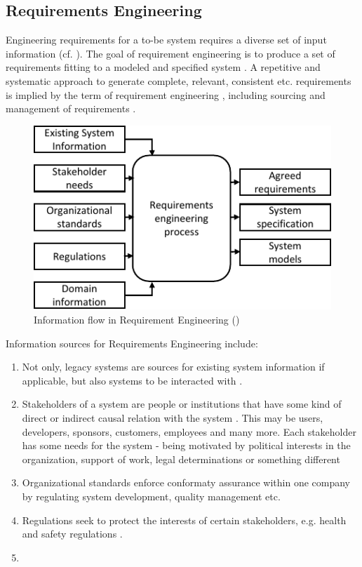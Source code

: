 \subsection{Requirements Engineering \label{ssec:reqEn}}
Engineering requirements for a to-be system requires a diverse set of input information (cf. ). The goal of requirement engineering is to produce a set of requirements fitting to a modeled and specified system \parencite[cf.][28]{Kotonya.2000}. A repetitive\label{iterative} and systematic approach to generate complete, relevant, consistent etc. requirements is implied by the term of requirement engineering \parencite[5]{Sommerville.2000}, including sourcing and management of requirements \parencite[262]{Pohl.2007}.
\begin{figure}[H]
    \centering
    \includegraphics[scale=1.3]{img/RequirementInformationStream.pdf}
    \caption[Information flow in Requirements Engineering]{Information flow in Requirement Engineering (\protect\cite[28]{Kotonya.2000})}
    \label{fig:reqFlow}
\end{figure}
Information sources for Requirements Engineering include:
\begin{enumerate}
    \item Not only, legacy systems are sources for existing system information if applicable, but also systems to be interacted with \parencite[cf.][28]{Kotonya.2000}.
    \item Stakeholders of a system are people or institutions that have some kind of direct or indirect causal relation with the system \parencite[cf.][8]{Sommerville.2000}. This may be users, developers, sponsors, customers, employees and many more. Each stakeholder has some needs for the system - being motivated by political interests in the organization, support of work, legal determinations or something different \parencites[cf.][28]{Kotonya.2000}[cf.][350-351]{Lauesen.2008}
    \item Organizational standards enforce conformaty assurance within one company by regulating system development, quality management etc. \parencite[28]{Kotonya.2000}
    \item Regulations seek to protect the interests of certain stakeholders, e.g. health and safety regulations \parencite[cf.][28]{Kotonya.2000}.
    \item {} \parencite[28]{Kotonya.2000} 
\end{enumerate}

